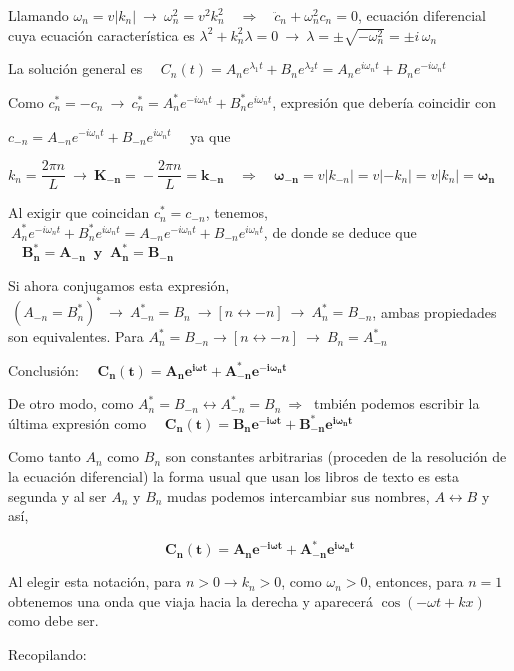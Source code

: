 Llamando $\omega_n=v|k_n| \ \to \ \omega_n^2=v^2k_n^2 \quad \Rightarrow \quad \ddot c_n+\omega_n^2c_n=0$, ecuación diferencial cuya ecuación característica es $\lambda^2+k_n^2 \lambda=0 \ \to \ \lambda=\pm \sqrt{-\omega_n^2}=\pm i\, \omega_n$

La solución general es $\quad C_n(t)=A_ne^{\lambda_1t}+B_ne^{\lambda_2t}=A_ne^{i\omega_nt}+B_ne^{-i\omega_nt}$

Como $c_n^*=-c_n \ \to \ c_n^*=A_n^*e^{-i\omega_nt}+B_n^*e^{i\omega_nt}$, expresión que debería coincidir con 

$c_{-n}=A_{-n}e^{-i\omega_nt}+B_{-n}e^{i\omega_nt} \quad$  ya que 

$ k_n=\dfrac{2\pi n}L \ \to \ \boldsymbol{K_{-n} =} -\dfrac{2\pi n}L \boldsymbol{=k_{-n}} \quad \Rightarrow \quad \boldsymbol {\omega_{-n}}=v|k_{-n}|=v|-k_n|=v|k_n|\boldsymbol{=\omega_n}$

Al exigir que coincidan $c_n^*=c_{-n}$, tenemos, $\ A_n^*e^{-i\omega_nt}+B_n^*e^{i\omega_nt}=A_{-n}e^{-i\omega_nt}+B_{-n}e^{i\omega_nt}$, de donde se deduce que $\quad \boldsymbol{ B_n^*=A_{-n} \ \text{ y } \ A_n^*=B_{-n}}$


Si ahora conjugamos esta expresión, $\ (A_{-n}=B_n^*)^* \ \to \ A^*_{-n}=B_n \ \to [n \leftrightarrow -n]  \ \to \ A_n^*=B_{-n}$, ambas propiedades son equivalentes. Para $A^*_n=B_{-n} \to [n\leftrightarrow -n]\ \to \ B_n=A^*_{-n}$

Conclusión: $\quad \boldsymbol{ C_n(t)=A_ne^{i\omega t} + A^*_{-n} e^{-i\omega_n t}}$

De otro modo, como $A^*_n=B_{-n} \leftrightarrow A^*_{-n}=B_n \ \Rightarrow \ $ tmbién podemos escribir la última expresión como  $\quad \boldsymbol{ C_n(t)=B_ne^{-i\omega t} + B^*_{-n} e^{i\omega_n t}}$

Como tanto $A_n$ como $B_n$ son constantes arbitrarias (proceden de la resolución de la ecuación diferencial) la forma usual que usan los libros de texto es esta segunda y al ser $A_n$ y $B_n$  mudas podemos intercambiar sus nombres, $A\leftrightarrow B$ y así,

$$\boldsymbol  {C_n(t)=A_ne^{-i\omega t} + A^*_{-n} e^{i\omega_n t}}$$

Al elegir esta notación, para $n>0 \to k_n>0$, como $\omega_n>0$, entonces, para $n=1$ obtenemos una onda que viaja hacia la derecha y aparecerá $\cos (-\omega t+kx)$ como debe ser.

Recopilando:

\vspace{5mm} 



